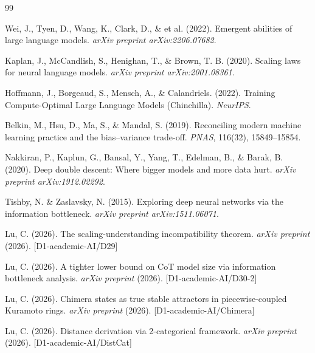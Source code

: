 \documentclass[12pt]{article}
\theoremstyle{definition}
\theoremstyle{remark}
\begin{document}

\begin{thebibliography}{99}

Wei, J., Tyen, D., Wang, K., Clark, D., \& et al. (2022).
Emergent abilities of large language models.
\textit{arXiv preprint arXiv:2206.07682}.

Kaplan, J., McCandlish, S., Henighan, T., \& Brown, T. B. (2020).
Scaling laws for neural language models.
\textit{arXiv preprint arXiv:2001.08361}.

Hoffmann, J., Borgeaud, S., Mensch, A., \& Calandriels. (2022).
Training Compute-Optimal Large Language Models (Chinchilla).
\textit{NeurIPS}.

Belkin, M., Hsu, D., Ma, S., \& Mandal, S. (2019).
Reconciling modern machine learning practice and the bias--variance trade-off.
\textit{PNAS}, 116(32), 15849--15854.

Nakkiran, P., Kaplun, G., Bansal, Y., Yang, T., Edelman, B., \& Barak, B. (2020).
Deep double descent: Where bigger models and more data hurt.
\textit{arXiv preprint arXiv:1912.02292}.

Tishby, N. \& Zaslavsky, N. (2015).
Exploring deep neural networks via the information bottleneck.
\textit{arXiv preprint arXiv:1511.06071}.

Lu, C. (2026).
The scaling-understanding incompatibility theorem.
\textit{arXiv preprint} (2026). [D1-academic-AI/D29]

Lu, C. (2026).
A tighter lower bound on CoT model size via information bottleneck analysis.
\textit{arXiv preprint} (2026). [D1-academic-AI/D30-2]

Lu, C. (2026).
Chimera states as true stable attractors in piecewise-coupled Kuramoto rings.
\textit{arXiv preprint} (2026). [D1-academic-AI/Chimera]

Lu, C. (2026).
Distance derivation via 2-categorical framework.
\textit{arXiv preprint} (2026). [D1-academic-AI/DistCat]

\end{thebibliography}
\end{document}
